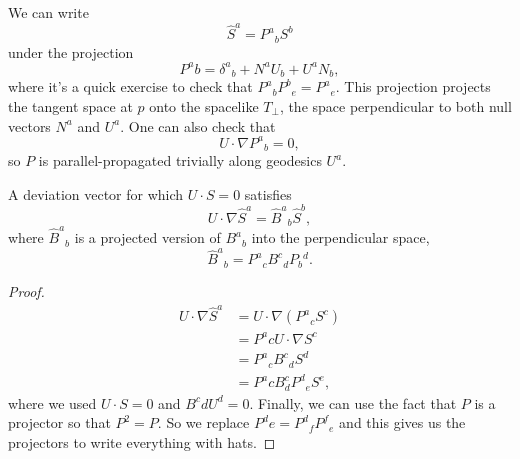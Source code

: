 We can write
\begin{equation}
    \hat S^a = P^a{}_b S^b
\end{equation}
under the projection
\begin{equation}
    P^a{}b = \delta^a{}_b + N^a U_b + U^a N_b,
\end{equation}
where it's a quick exercise to check that $P^a{}_b P^b{}_e = P^a{}_e.$ This projection projects the tangent space at $p$ onto the spacelike $T_\perp$, the space perpendicular to both null vectors $N^a$ and $U^a$.
One can also check that
\begin{equation}
    U\cdot \nabla P^a{}_b =0,
\end{equation}
so $P$ is parallel-propagated trivially along geodesics $U^a$.

\begin{prop}
    A deviation vector for which $U\cdot S=0$ satisfies
    \begin{equation}
        U\cdot \nabla \hat S^a = \hat B^a{}_b \hat S^b,
    \end{equation}
    where $\hat B^a{}_b$ is a projected version of $B^a{}_b$ into the perpendicular space,
    \begin{equation}
        \hat B^a{}_b=P^a{}_c B^c{}_d P_b{}^d.
    \end{equation}
\end{prop}
\begin{proof}
    \begin{align*}
        U\cdot \nabla \hat S^a &= U\cdot \nabla(P^a{}_c S^c)\\
            &= P^a{}c U\cdot \nabla S^c\\
            &= P^a{}_c B^c{}_d S^d\\
            &= P^a{}c B^c_d P^d{}_e S^e,
    \end{align*}
    where we used $U\cdot S=0$ and $B^c{}d U^d=0$. Finally, we can use the fact that $P$ is a projector so that $P^2=P$. So we replace $P^d{}e=P^d{}_f P^f{}_e$ and this gives us the projectors to write everything with hats.
\end{proof}

